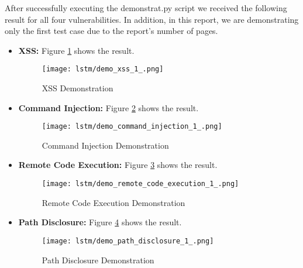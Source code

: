 After successfully executing the demonstrat.py script we received the following result for all four vulnerabilities. 
In addition, in this report, we are demonstrating only the first test case due to the report's number of pages.
\begin{itemize}
 \item \textbf{XSS:} Figure \ref{fig:xss_demonstration} shows the result. 
 \begin{figure}
 \centering
 \texttt{[image: lstm/demo\_xss\_1\_.png]}
 \caption{XSS Demonstration}
 \label{fig:xss_demonstration}
 \end{figure}
 \item \textbf{Command Injection:} Figure \ref{fig:command_injection_demonstration} shows the result.
 \begin{figure}[H]
 \centering
 \texttt{[image: lstm/demo\_command\_injection\_1\_.png]}
 \caption{Command Injection Demonstration}
 \label{fig:command_injection_demonstration}
 \end{figure}
 \item \textbf{Remote Code Execution:} Figure \ref{fig:remote_code_execution_demonstration} shows the result.
 \begin{figure}[H]
 \centering
 \texttt{[image: lstm/demo\_remote\_code\_execution\_1\_.png]}
 \caption{Remote Code Execution Demonstration}
 \label{fig:remote_code_execution_demonstration}
 \end{figure}
 \item \textbf{Path Disclosure:} Figure \ref{fig:path_disclosure_demonstration} shows the result.
 \begin{figure}[H]
 \centering
 \texttt{[image: lstm/demo\_path\_disclosure\_1\_.png]}
 \caption{Path Disclosure Demonstration}
 \label{fig:path_disclosure_demonstration}
 \end{figure}
\end{itemize}

